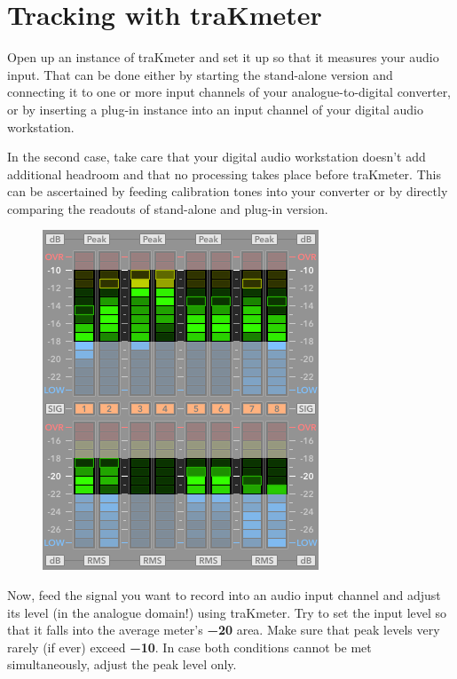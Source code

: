 \section{Tracking with traKmeter}
\label{sec:tracking_with_trakmeter}

Open up an instance of traKmeter and set it up so that it measures
your audio input.  That can be done either by starting the stand-alone
version and connecting it to one or more input channels of your
analogue-to-digital converter, or by inserting a plug-in instance into
an input channel of your digital audio workstation.

In the second case, take care that your digital audio workstation
doesn't add additional headroom and that no processing takes place
before traKmeter.  This can be ascertained by feeding calibration
tones into your converter or by directly comparing the readouts of
stand-alone and plug-in version.

\begin{figure}
\includegraphics[scale=0.425,clip]{include/images/trakmeter_optimal.png}
\end{figure}

Now, feed the signal you want to record into an audio input channel
and adjust its level (in the analogue domain!) using traKmeter.  Try
to set the input level so that it falls into the average meter's
\textbf{\SI{-20}{\dBFS}} area.  Make sure that peak levels very rarely
(if ever) exceed \textbf{\SI{-10}{\dBFS}}.  In case both conditions
cannot be met simultaneously, adjust the peak level only.

